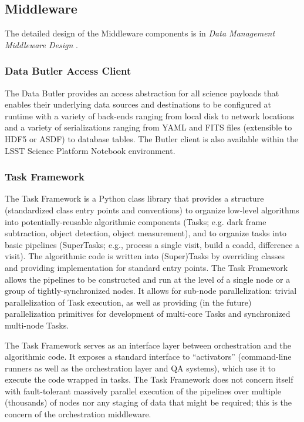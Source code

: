 \documentclass[DM,toc,lsstdraft]{lsstdoc}
\begin{document}
\subsection{Middleware}\label{middleware}

The detailed design of the Middleware components is in \textit{Data Management Middleware Design} .

\subsubsection{Data Butler Access
Client}\label{data-butler-access-client}

The Data Butler provides an access abstraction for all science payloads
that enables their underlying data sources and destinations to be
configured at runtime with a variety of back-ends ranging from local
disk to network locations and a variety of serializations ranging from
YAML and FITS files (extensible to HDF5 or ASDF) to database tables. The
Butler client is also available within the LSST Science Platform
Notebook environment.

\subsubsection{Task Framework}\label{task-framework}

The Task Framework is a Python class library that provides a structure
(standardized class entry points and conventions) to organize low-level
algorithms into potentially-reusable algorithmic components (Tasks; e.g.
dark frame subtraction, object detection, object measurement), and to
organize tasks into basic pipelines (SuperTasks; e.g., process a single
visit, build a coadd, difference a visit). The algorithmic code is
written into (Super)Tasks by overriding classes and providing
implementation for standard entry points. The Task Framework allows the
pipelines to be constructed and run at the level of a single node or a
group of tightly-synchronized nodes. It allows for sub-node
parallelization: trivial parallelization of Task execution, as well as
providing (in the future) parallelization primitives for development of
multi-core Tasks and synchronized multi-node Tasks.

The Task Framework serves as an interface layer between orchestration
and the algorithmic code. It exposes a standard interface to
``activators'' (command-line runners as well as the orchestration layer
and QA systems), which use it to execute the code wrapped in tasks. The
Task Framework does not concern itself with fault-tolerant massively
parallel execution of the pipelines over multiple (thousands) of nodes
nor any staging of data that might be required; this is the concern of
the orchestration middleware.
\end{document}
